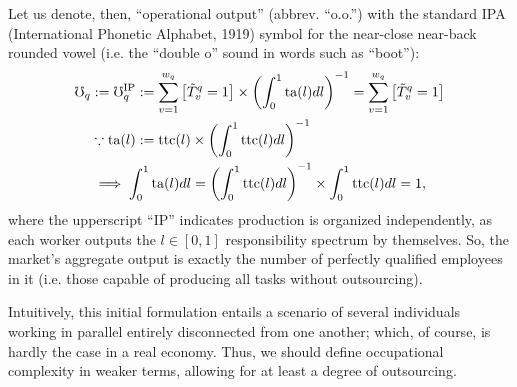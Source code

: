 \documentclass[hidelinks, nonatbib]{elsarticle}
\begin{document}
\begin{axiom}
    \begin{subaxiom}
        Let us denote, then, ``operational output'' (abbrev. ``o.o.'') with the standard IPA (International Phonetic Alphabet, 1919) symbol for the near-close near-back rounded vowel (i.e. the ``double o'' sound in words such as ``boot''):
        \begin{align}
            \mho_q
            &
            :=
            \mho_{q}^{\text{IP}}
            :=
            \sum_{v=1}^{w_q}{
                \left[
                    \tilde{T}_{v}^{q}
                    =
                    1
                \right]
                \times
                \left(
                    \int_{0}^{1}{
                        \text{ta}(l)
                        dl
                    }
                \right) ^ {-1}
            }
            =
            \sum_{v=1}^{w_q}{
                \left[
                    \tilde{T}_{v}^{q}
                    =
                    1
                \right]
            }
            \\
            &\because
            \text{ta}(l) 
            :=
            \text{ttc}(l)
            \times
            \left(
                \int_{0}^{1}{
                    \text{ttc}(l)
                    dl
                }
            \right) ^ {-1}
            \\
            &
            \implies
            \int_{0}^{1}{
                \text{ta}(l)
                dl
            }
            =
            \left(
                \int_{0}^{1}
                \text{ttc}(l)
                dl
            \right) ^ {-1}
            \times
            \int_{0}^{1}{
                \text{ttc}(l)
                dl
            }
            =
            1
            ,
        \end{align}
        where the upperscript ``IP'' indicates production is organized independently, as each worker outputs the $l \in [0,1]$ responsibility spectrum by themselves. So, the market's aggregate output is exactly the number of perfectly qualified employees in it (i.e. those capable of producing all tasks without outsourcing).
        
        Intuitively, this initial formulation entails a scenario of several individuals working in parallel entirely disconnected from one another; which, of course, is hardly the case in a real economy. Thus, we should define occupational complexity in weaker terms, allowing for at least a degree of outsourcing.
    \end{subaxiom}


\end{axiom}
\end{document}
